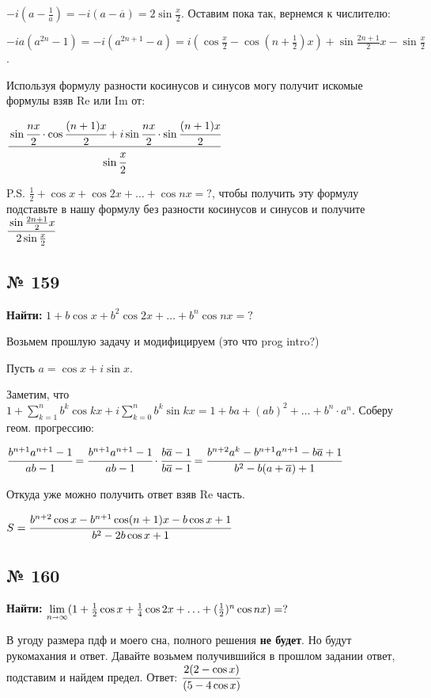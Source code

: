 \documentclass{article}
\begin{document}
$ -i(a-\frac{1}{a}) = -i(a-\overline{a}) =2 \sin\frac{x}{2}$. Оставим пока так, вернемся к числителю:

$-ia(a^{2n}-1)=-i(a^{2n+1}-a) = i(\cos \frac{x}{2}-\cos (n+\frac{1}{2})x) + \sin\frac{2n+1}{2}x-\sin \frac{x}{2} $.  

Используя формулу разности косинусов и синусов могу получит искомые формулы взяв Re или Im от:

$\cfrac{\sin \cfrac{n x}{2}\cdot \cos \cfrac{(n+1)x}{2}+ i \sin \cfrac{n x}{2}\cdot \sin \cfrac{(n+1) x}{2}}{\sin \cfrac{x}{2}}$

P.S. $\frac{1}{2}+ \cos x + \cos 2x + \ldots +\cos nx = ?$, чтобы получить эту формулу подставьте в нашу формулу без разности косинусов и синусов и получите $\cfrac{\sin \frac{2n+1}{2}x}{2\sin\frac{x}{2}}$

\pagebreak
\subsection{№ 159}

\textbf{Найти: }$1+ b\cos x + b^2\cos 2x + \ldots +b^n\cos nx = ?$

Возьмем прошлую задачу и модифицируем (это что prog intro?)

Пусть $a =\cos x + i\sin x.$

Заметим, что $1+\sum\limits_{k=1}^n b^k\cos kx + i\sum\limits_{k=0}^n b^k\sin kx =1 + ba+(ab)^2+\ldots + b^n\cdot a^n$. Соберу геом. прогрессию:

$\cfrac{b^{n+1}a^{n+1}-1}{ab-1} = \cfrac{b^{n+1}a^{n+1}-1}{ab-1} \cdot \cfrac{b\overline{a}-1}{b\overline{a}-1} =\cfrac{ b^{n+2}a^k - b^{n+1}a^{n+1}-b\overline{a}+1}{b^2-b(a+\overline{a})+1}$

Откуда уже можно получить ответ взяв Re часть.

$S=\cfrac{b^{n+2}\cos x - b^{n+1}\cos(n+1)x -b\cos x  + 1}{b^2-2b\cos x + 1}$


\pagebreak
\subsection{№ 160}

\textbf{Найти: } $\lim\limits_{n\shortrightarrow \infty}(1+ \frac{1}{2}\cos x + \frac{1}{4}\cos 2x + \ldots +(\frac{1}{2})^n\cos nx )= ?$

В угоду размера пдф и моего сна, полного решения \textbf{не будет}. Но будут рукомахания и ответ. Давайте возьмем получившийся в прошлом задании ответ, подставим и найдем предел. Ответ: $\cfrac{2(2-\cos x)}{(5-4\cos x)}$
\pagebreak
\end{document}

